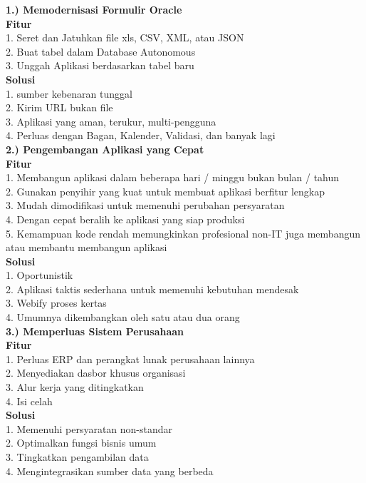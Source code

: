 \documentclass[12pt, times new roman, a4paper]{article}
\begin{document}
\textbf{1.) Memodernisasi Formulir Oracle}\\
\textbf{Fitur}\\
1. Seret dan Jatuhkan file xls, CSV, XML, atau JSON\\
2. Buat tabel dalam Database Autonomous\\
3. Unggah Aplikasi berdasarkan tabel baru\\
\textbf{Solusi}\\
1. sumber kebenaran tunggal\\
2. Kirim URL bukan file\\
3. Aplikasi yang aman, terukur, multi-pengguna\\
4. Perluas dengan Bagan, Kalender, Validasi, dan banyak lagi\\
\textbf{2.) Pengembangan Aplikasi yang Cepat}\\
\textbf{Fitur}\\
1. Membangun aplikasi dalam beberapa hari / minggu bukan bulan / tahun\\
2. Gunakan penyihir yang kuat untuk membuat aplikasi berfitur lengkap\\
3. Mudah dimodifikasi untuk memenuhi perubahan persyaratan\\
4. Dengan cepat beralih ke aplikasi yang siap produksi\\
5. Kemampuan kode rendah memungkinkan profesional non-IT juga membangun atau membantu membangun aplikasi\\
\textbf{Solusi}\\
1. Oportunistik\\
2. Aplikasi taktis sederhana untuk memenuhi kebutuhan mendesak\\
3. Webify proses kertas\\
4. Umumnya dikembangkan oleh satu atau dua orang\\
\textbf{3.) Memperluas Sistem Perusahaan}\\
\textbf{Fitur}\\
1. Perluas ERP dan perangkat lunak perusahaan lainnya\\
2. Menyediakan dasbor khusus organisasi\\
3. Alur kerja yang ditingkatkan\\
4. Isi celah\\
\textbf{Solusi}\\
1. Memenuhi persyaratan non-standar\\
2. Optimalkan fungsi bisnis umum\\
3. Tingkatkan pengambilan data\\
4. Mengintegrasikan sumber data yang berbeda\\
\end{document}
